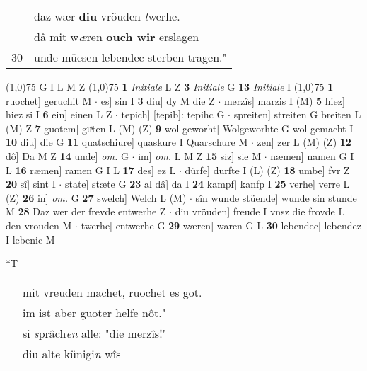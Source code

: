 \documentclass[8pt,a4paper,notitlepage]{article}
\begin{document}
\begin{table}[ht]
\begin{minipage}[t]{0.5\linewidth}
\begin{tabular}{rl}
 & daz wær \textbf{diu} vröuden \textit{t}werhe.\\ 
 & dâ mit w\textit{æ}ren \textbf{ouch wir} erslagen\\ 
30 & unde müesen lebendec sterben tragen."\\ 
\end{tabular}
\scriptsize
\line(1,0){75} \newline
G I L M Z \newline
\line(1,0){75} \newline
\textbf{1} \textit{Initiale} L Z  \textbf{3} \textit{Initiale} G  \textbf{13} \textit{Initiale} I  \newline
\line(1,0){75} \newline
\textbf{1} ruochet] geruchit M  $\cdot$ es] sin I \textbf{3} diu] dy M die Z  $\cdot$ merzîs] marzis I (M) \textbf{5} hiez] hiez si I \textbf{6} ein] einen L Z  $\cdot$ tepich] [tepib]: tepihc G  $\cdot$ spreiten] streiten G breiten L (M) Z \textbf{7} guotem] guͯten L (M) (Z) \textbf{9} wol geworht] Wolgeworhte G wol gemacht I \textbf{10} diu] die G \textbf{11} quatschiure] quaskure I Quarschure M  $\cdot$ zen] zer L (M) (Z) \textbf{12} dô] Da M Z \textbf{14} unde] \textit{om.} G  $\cdot$ im] \textit{om.} L M Z \textbf{15} siz] sie M  $\cdot$ næmen] namen G I L \textbf{16} ræmen] ramen G I L \textbf{17} des] ez L  $\cdot$ dürfe] durfte I (L) (Z) \textbf{18} umbe] fvr Z \textbf{20} sî] sint I  $\cdot$ state] stæte G \textbf{23} al dâ] da I \textbf{24} kampf] kanfp I \textbf{25} verhe] verre L (Z) \textbf{26} in] \textit{om.} G \textbf{27} swelch] Welch L (M)  $\cdot$ sîn wunde stüende] wunde sin stunde M \textbf{28} Daz wer der frevde entwerhe Z  $\cdot$ diu vröuden] freude I vnsz die frovde L den vrouden M  $\cdot$ twerhe] entwerhe G \textbf{29} wæren] waren G L \textbf{30} lebendec] lebendez I lebenic M \newline
\end{minipage}
\hspace{0.5cm}
\begin{minipage}[t]{0.5\linewidth}
\small
\begin{center}*T
\end{center}
\begin{tabular}{rl}
 & mit vreuden machet, ruochet es got.\\ 
 & im ist aber guoter helfe nôt."\\ 
 & si \textit{s}prâch\textit{en} alle: "die merzîs!"\\ 
 & diu alte künigi\textit{n} wîs\\ 

\end{tabular}
\end{minipage}
\end{table}
\end{document}
